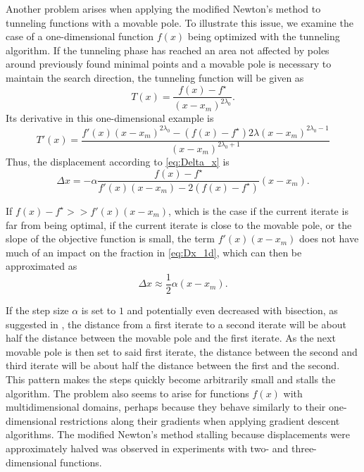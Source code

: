 \documentclass[a4paper,12pt,twoside]{article}
\begin{document}
Another problem arises when applying the modified Newton's method to tunneling functions with a movable pole. To illustrate this issue, we examine the case of a one-dimensional function $f(x)$ being optimized with the tunneling algorithm. If the tunneling phase has reached an area not affected by poles around previously found minimal points and a movable pole is necessary to maintain the search direction, the tunneling function will be given as 
\begin{equation}
T(x) = \frac{f(x) - f^\star}{(x-x_m)^{2 \lambda_0}}.
\end{equation}
Its derivative in this one-dimensional example is 
\begin{equation}
T'(x) = \frac{f'(x) (x-x_m)^{2\lambda_0} - 
        (f(x)-f^\star ) 2\lambda (x-x_m)^{2 \lambda_0-1}}
    {(x-x_m)^{2\lambda_0 + 1}}
\end{equation}  
Thus, the displacement according to \eqref{eq:Delta_x} is 
\begin{equation} \label{eq:Dx_1d}
\Delta x = -\alpha \frac{f(x)-f^\star}{f'(x) (x-x_m) -2(f(x)-f^\star)} (x-x_m).
\end{equation}

If $f(x)-f^\star >> f'(x) (x-x_m)$, which is the case if the current iterate is far from being optimal, if the current iterate is close to the movable pole, or the slope of the objective function is small, the term $f'(x) (x-x_m)$ does not have much of an impact on the fraction in \eqref{eq:Dx_1d}, which can then be approximated as 
\begin{equation} \label{eq:Delta_x_approx}
\Delta x \approx \frac12 \alpha (x-x_m).
\end{equation}

If the step size $\alpha$ is set to $1$ and potentially even decreased with bisection, as suggested in \cite[\S 2.3.4]{levy_tunneling_1985}, the distance from a first iterate to a second iterate will be about half the distance between the movable pole and the first iterate. As the next movable pole is then set to said first iterate, the distance between the second and third iterate will be about half the distance between the first and the second. This pattern makes the steps quickly become arbitrarily small and stalls the algorithm. The problem also seems to arise for functions $f(x)$ with multidimensional domains, perhaps because they behave similarly to their one-dimensional restrictions along their gradients when applying gradient descent algorithms. The modified Newton's method stalling because displacements were approximately halved was observed in experiments with two- and three-dimensional functions. 
\end{document}
